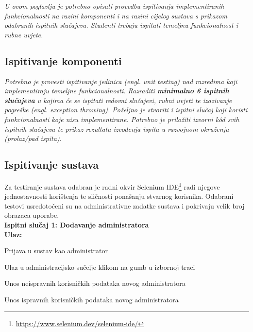 			 \textit{U ovom poglavlju je potrebno opisati provedbu ispitivanja implementiranih funkcionalnosti na razini komponenti i na razini cijelog sustava s prikazom odabranih ispitnih slučajeva. Studenti trebaju ispitati temeljnu funkcionalnost i rubne uvjete.}
	
			
			\subsection{Ispitivanje komponenti}
			\textit{Potrebno je provesti ispitivanje jedinica (engl. unit testing) nad razredima koji implementiraju temeljne funkcionalnosti. Razraditi \textbf{minimalno 6 ispitnih slučajeva} u kojima će se ispitati redovni slučajevi, rubni uvjeti te izazivanje pogreške (engl. exception throwing). Poželjno je stvoriti i ispitni slučaj koji koristi funkcionalnosti koje nisu implementirane. Potrebno je priložiti izvorni kôd svih ispitnih slučajeva te prikaz rezultata izvođenja ispita u razvojnom okruženju (prolaz/pad ispita). }
			
			 

		\subsection{Ispitivanje sustava}
			
			Za testiranje sustava odabran je radni okvir Selenium IDE\footnote{\url{https://www.selenium.dev/selenium-ide/}} radi njegove jednostavnosti korištenja te sličnosti ponašanju stvarnog korisnika. Odabrani testovi usredotočeni su na administrativne zadatke sustava i pokrivaju velik broj obrazaca uporabe.\\ 
			
			\noindent  \textbf{Ispitni slučaj 1: Dodavanje administratora}\\
			 \textbf{Ulaz:}
			 \begin{packed_enum}
			 	\item {Prijava u sustav kao administrator}
			 	\item {Ulaz u administracijsko sučelje klikom na gumb u izbornoj traci}
			 	\item {Unos neispravnih korisničkih podataka novog administratora}
			 	\item {Unos ispravnih korisničkih podataka novog administratora}
			 \end{packed_enum}
			 

